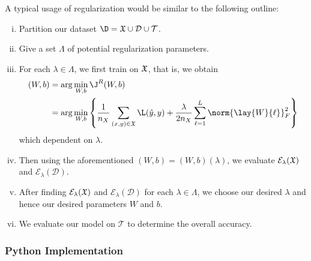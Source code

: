 A typical usage of regularization would be similar to the following outline:
\begin{enumerate}[i.]
	\item Partition our dataset $\D=\frak{X}\cup\mathcal{D}\cup\mathcal{T}$.
	\item Give a set $\Lambda$ of potential regularization parameters.
	\item For each $\lambda\in\Lambda$, we first train on $\frak{X}$, that is, we obtain
		\begin{align*}
			(W,b)&=\arg\min_{W,b}\J^R(W,b)\\
			&=\arg\min_{W,b}\left\{\frac{1}{n_X}\sum_{(x,y)\in\frak{X}}\L(\hat{y},y)+\frac{\lambda}{2n_X}\sum_{\ell=1}^L\norm{\lay{W}{\ell}}_F^2\right\}
		\end{align*}
		which dependent on $\lambda$.
	\item Then using the aforementioned $(W,b)=(W,b)(\lambda)$, we evaluate $\mathcal{E}_\lambda(\frak{X})$ and $\mathcal{E}_\lambda(\mathcal{D})$.
	\item After finding $\mathcal{E}_\lambda(\frak{X})$ and $\mathcal{E}_\lambda(\mathcal{D})$ for each $\lambda\in\Lambda$, we choose our desired $\lambda$ and hence our desired parameters $W$ and $b$.
	\item We evaluate our model on $\mathcal{T}$ to determine the overall accuracy.
\end{enumerate}


\subsubsection{Python Implementation}



